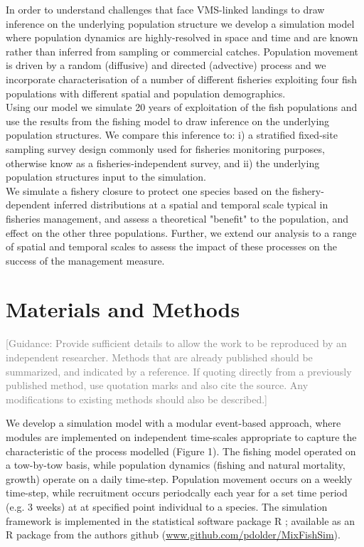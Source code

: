 \documentclass[review]{elsarticle}
\begin{document}
In order to understand challenges that face VMS-linked landings to draw
inference on the underlying population structure we develop a simulation model
where population dynamics are highly-resolved in space and time and are known
rather than inferred from sampling or commercial catches. Population movement
is driven by a random (diffusive) and directed (advective) process and we
incorporate characterisation of a number of different fisheries exploiting four
fish populations with different spatial and population demographics.\\

Using our model we simulate 20 years of exploitation of the fish populations
and use the results from the fishing model to draw inference on the underlying
population structures.  We compare this inference to: i) a stratified
fixed-site sampling survey design commonly used for fisheries monitoring
purposes, otherwise know as a fisheries-independent
	survey, and ii) the underlying population structures input to the
simulation.\\

We simulate a fishery closure to protect one species based on the
fishery-dependent inferred distributions at a spatial and temporal scale
typical in fisheries management, and assess a theoretical "benefit" to the
population, and effect on the other three populations. Further, we extend our
analysis to a range of spatial and temporal scales to assess the impact of
these processes on the success of the management measure. \\

\section{Materials and Methods}

\textcolor{gray}{[Guidance: Provide sufficient details to allow the work to be
reproduced by an independent researcher. Methods that are already published
should be summarized, and indicated by a reference.  If quoting directly from a
previously published method, use quotation marks and also cite the source. Any
modifications to existing methods should also be described.] \\ }

We develop a simulation model with a modular event-based approach, where
modules are implemented on independent time-scales appropriate to capture the
characteristic of the process modelled (Figure 1). The fishing model operated on a
tow-by-tow basis, while population dynamics (fishing and natural mortality,
growth) operate on a daily time-step.  Population movement occurs on a
weekly time-step, while recruitment occurs periodcally each year for a set
time period (e.g. 3 weeks) at at specified point individual to a species. The
simulation framework is implemented in the statistical software package R
\cite{RCoreTeam2017}; available as an R package from the authors github
(\url{www.github.com/pdolder/MixFishSim}).\\
\end{document}

